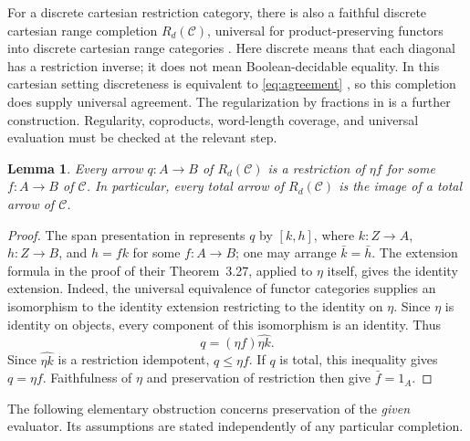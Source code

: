 \documentclass[11pt]{article}
\newtheorem{lemma}[theorem]{Lemma}
\newcommand{\C}{\mathscr C}
\begin{document}
For a discrete cartesian restriction category, there is also a faithful
discrete cartesian range completion $R_d(\C)$, universal for
product-preserving functors into discrete cartesian range categories
\cite[Theorem~3.27]{CGH2}. Here discrete means that each diagonal has a
restriction inverse; it does not mean Boolean-decidable equality.
In this cartesian setting discreteness is equivalent to
\eqref{eq:agreement} \cite[Proposition~3.11]{CGH2}, so this completion
does supply universal agreement.
The regularization by fractions in \cite[Theorem~3.19]{CGH2} is a
further construction. Regularity, coproducts, word-length coverage,
and universal evaluation must be checked at the relevant step.

\begin{lemma}\label{lem:no-new-total}
Every arrow $q:A\to B$ of $R_d(\C)$ is a restriction of
$\eta f$ for some $f:A\to B$ of $\C$.
In particular, every total arrow of $R_d(\C)$ is the image of a
total arrow of $\C$.
\end{lemma}
\begin{proof}
The span presentation in \cite[Construction~3.21 and Lemma~3.22]{CGH2}
represents $q$ by $[k,h]$, where $k:Z\to A$, $h:Z\to B$,
and $h=fk$ for some $f:A\to B$; one may arrange
$\bar k=\bar h$.
The extension formula in the proof of their Theorem~3.27, applied
to $\eta$ itself, gives the identity extension. Indeed, the
universal equivalence of functor categories supplies an isomorphism
to the identity extension restricting to the identity on $\eta$.
Since $\eta$ is identity on objects, every component of this
isomorphism is an identity. Thus
\[
 q=(\eta f)\widehat{\eta k}.
\]
Since $\widehat{\eta k}$ is a restriction idempotent, $q\leq\eta f$.
If $q$ is total, this inequality gives $q=\eta f$.
Faithfulness of $\eta$ and preservation of restriction then give
$\bar f=1_A$.
\end{proof}

The following elementary obstruction concerns preservation of the
\emph{given} evaluator. Its assumptions are stated independently of
any particular completion.
\end{document}

